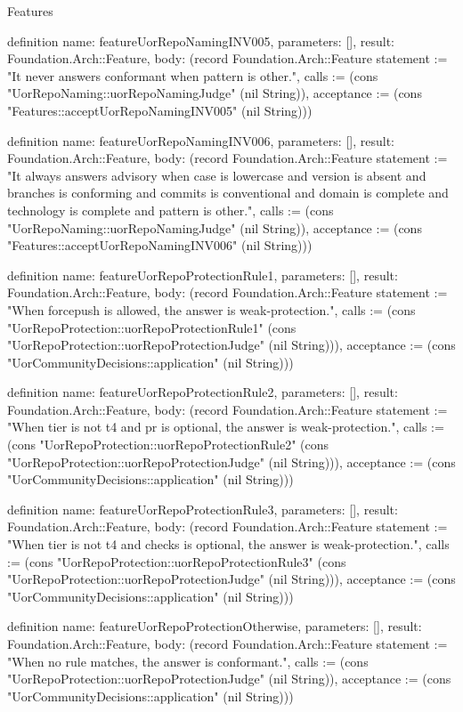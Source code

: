 \begin{lexlean}{Features}
\begin{semanticmodule}
definition{
  name: featureUorRepoNamingINV005,
  parameters: [],
  result: Foundation.Arch::Feature,
  body: (record Foundation.Arch::Feature {statement := "It never answers conformant when pattern is other.", calls := (cons "UorRepoNaming::uorRepoNamingJudge" (nil String)), acceptance := (cons "Features::acceptUorRepoNamingINV005" (nil String))})
}

definition{
  name: featureUorRepoNamingINV006,
  parameters: [],
  result: Foundation.Arch::Feature,
  body: (record Foundation.Arch::Feature {statement := "It always answers advisory when case is lowercase and version is absent and branches is conforming and commits is conventional and domain is complete and technology is complete and pattern is other.", calls := (cons "UorRepoNaming::uorRepoNamingJudge" (nil String)), acceptance := (cons "Features::acceptUorRepoNamingINV006" (nil String))})
}

definition{
  name: featureUorRepoProtectionRule1,
  parameters: [],
  result: Foundation.Arch::Feature,
  body: (record Foundation.Arch::Feature {statement := "When forcepush is allowed, the answer is weak-protection.", calls := (cons "UorRepoProtection::uorRepoProtectionRule1" (cons "UorRepoProtection::uorRepoProtectionJudge" (nil String))), acceptance := (cons "UorCommunityDecisions::application" (nil String))})
}

definition{
  name: featureUorRepoProtectionRule2,
  parameters: [],
  result: Foundation.Arch::Feature,
  body: (record Foundation.Arch::Feature {statement := "When tier is not t4 and pr is optional, the answer is weak-protection.", calls := (cons "UorRepoProtection::uorRepoProtectionRule2" (cons "UorRepoProtection::uorRepoProtectionJudge" (nil String))), acceptance := (cons "UorCommunityDecisions::application" (nil String))})
}

definition{
  name: featureUorRepoProtectionRule3,
  parameters: [],
  result: Foundation.Arch::Feature,
  body: (record Foundation.Arch::Feature {statement := "When tier is not t4 and checks is optional, the answer is weak-protection.", calls := (cons "UorRepoProtection::uorRepoProtectionRule3" (cons "UorRepoProtection::uorRepoProtectionJudge" (nil String))), acceptance := (cons "UorCommunityDecisions::application" (nil String))})
}

definition{
  name: featureUorRepoProtectionOtherwise,
  parameters: [],
  result: Foundation.Arch::Feature,
  body: (record Foundation.Arch::Feature {statement := "When no rule matches, the answer is conformant.", calls := (cons "UorRepoProtection::uorRepoProtectionJudge" (nil String)), acceptance := (cons "UorCommunityDecisions::application" (nil String))})
}


\end{semanticmodule}
\end{lexlean}
